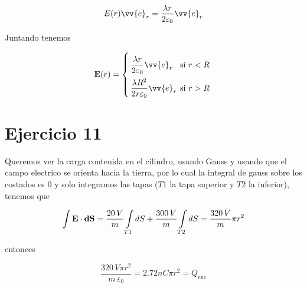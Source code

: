 \documentclass[leqno, 12pt, twoside, letterpaper]{book}
\def\efield{\textbf{E}}
\def\vdiff{\textbf{dS}}
\begin{document}
\[ E(r) \vv{e}_r = \dfrac{\lambda r }{2 \varepsilon_0} \vv{e}_r\]

Juntando tenemos

$$ \efield(r) = \twopartdef{\dfrac{\lambda r }{2 \varepsilon_0} \vv{e}_r}{ r < R }{\dfrac{\lambda R^2 }{2 r \varepsilon_0} \vv{e}_r}{\textrm{si } r > R} $$


\section*{Ejercicio 11} 

Queremos ver la carga contenida en el cilindro, usando Gauss y usando que el campo electrico se orienta hacia la tierra, por lo cual la integral de gauss sobre los costados es 0 y solo integramos las tapas ($T1$ la tapa superior y $T2$ la inferior), tenemos que

\[ \int \efield \cdot \vdiff = \dfrac{20 \, V}{m} \int\displaylimits_{T1} dS +  \dfrac{300 \,V}{m}\int\displaylimits_{T2} dS = \dfrac{320 \, V}{m} \pi r^2 \]

entonces
 
$$  \dfrac{320 \, V \pi r^2 }{m \, \varepsilon_0} = 2.72nC \pi r^2 =  Q_{\textrm{enc}} $$
\end{document}
